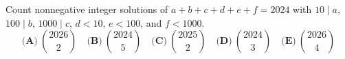 Count nonnegative integer solutions of $a+b+c+d+e+f=2024$ with $10\mid a$, $100\mid b$, $1000\mid c$, $d<10$, $e<100$, and $f<1000$.
\[\textbf{(A)}~\binom{2026}{2}\quad\textbf{(B)}~\binom{2024}{5}\quad\textbf{(C)}~\binom{2025}{2}\quad\textbf{(D)}~\binom{2024}{3}\quad\textbf{(E)}~\binom{2026}{4}\]
